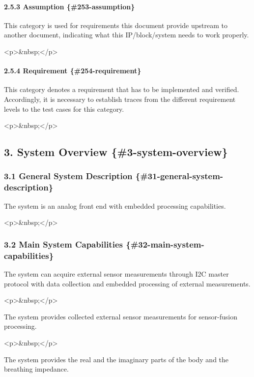 \documentclass[11pt]{article}
\begin{document}
\paragraph{2.5.3 Assumption \{\#253-assumption\}}


This category is used for requirements this document provide upstream to another document, indicating what this IP/block/system needs to work properly.

<p>\&nbsp;</p>

\paragraph{2.5.4 Requirement \{\#254-requirement\}}


This category denotes a requirement that has to be implemented and verified. Accordingly, it is necessary to establish traces from the different requirement levels to the test cases for this category.

<p>\&nbsp;</p>

\subsection{3. System Overview \{\#3-system-overview\}}


\subsubsection{3.1 General System Description \{\#31-general-system-description\}}


The system is an analog front end with embedded processing capabilities.

<p>\&nbsp;</p>

\subsubsection{3.2 Main System Capabilities \{\#32-main-system-capabilities\}}


The system can acquire external sensor measurements through I2C master protocol with data collection and embedded processing of external measurements.

<p>\&nbsp;</p>

The system provides collected external sensor measurements for sensor-fusion processing.

<p>\&nbsp;</p>

The system provides the real and the imaginary parts of the body and the breathing impedance.
\end{document}
